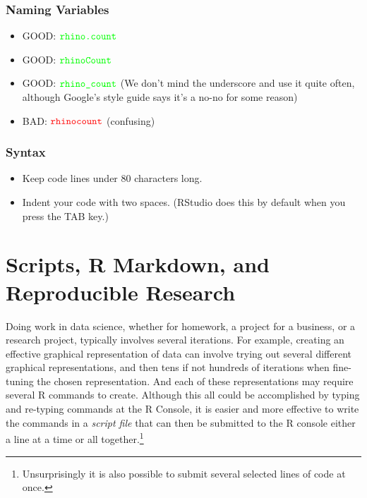 \documentclass[]{krantz}
\providecommand{\tightlist}{%
  \setlength{\itemsep}{0pt}\setlength{\parskip}{0pt}}
\theoremstyle{definition}
\theoremstyle{definition}
\theoremstyle{definition}
\theoremstyle{remark}
\begin{document}
\subsection{Naming Variables}\label{naming-variables}

\begin{itemize}
\tightlist
\item
  GOOD: \(\color{green}{\verb+rhino.count+}\)
\item
  GOOD: \(\color{green}{\verb+rhinoCount+}\)
\item
  GOOD: \(\color{green}{\verb+rhino_count+}\) (We don't mind the
  underscore and use it quite often, although Google's style guide says
  it's a no-no for some reason)
\item
  BAD: \(\color{red}{\verb+rhinocount+}\) (confusing)
\end{itemize}

\subsection{Syntax}\label{syntax}

\begin{itemize}
\tightlist
\item
  Keep code lines under 80 characters long.
\item
  Indent your code with two spaces. (RStudio does this by default when
  you press the TAB key.)
\end{itemize}

\chapter{Scripts, R Markdown, and Reproducible
Research}\label{scripts-r-markdown-and-reproducible-research}

Doing work in data science, whether for homework, a project for a
business, or a research project, typically involves several iterations.
For example, creating an effective graphical representation of data can
involve trying out several different graphical representations, and then
tens if not hundreds of iterations when fine-tuning the chosen
representation. And each of these representations may require several R
commands to create. Although this all could be accomplished by typing
and re-typing commands at the R Console, it is easier and more effective
to write the commands in a \emph{script file} that can then be submitted
to the R console either a line at a time or all together.\footnote{Unsurprisingly
  it is also possible to submit several selected lines of code at once.}
\end{document}
